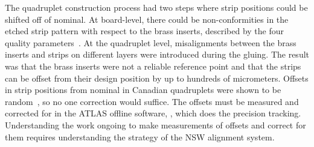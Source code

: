 
The quadruplet construction process had two steps where strip positions could be shifted off of nominal. At board-level, there could be non-conformities in the etched strip pattern with respect to the brass inserts, described by the four quality parameters~\cite{carlson_results_2019}. At the quadruplet level, misalignments between the brass inserts and strips on different layers were introduced during the gluing. The result was that the brass inserts were not a reliable reference point and that the strips can be offset from their design position by up to hundreds of micrometers. Offsets in strip positions from nominal in Canadian quadruplets were shown to be random~\cite{carlson_results_2019}, so no one correction would suffice. The offsets must be measured and corrected for in the ATLAS offline software, , which does the precision tracking. Understanding the work ongoing to make measurements of offsets and correct for them requires understanding the strategy of the NSW alignment system.



